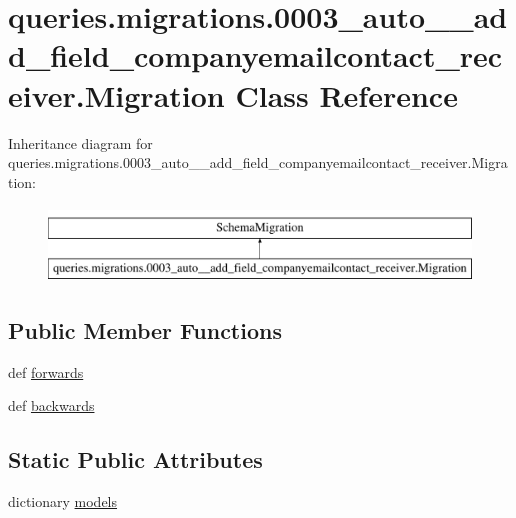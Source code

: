 \hypertarget{classqueries_1_1migrations_1_10003__auto____add__field__companyemailcontact__receiver_1_1_migration}{\section{queries.\-migrations.0003\-\_\-auto\-\_\-\-\_\-add\-\_\-field\-\_\-companyemailcontact\-\_\-receiver.Migration Class Reference}
\label{classqueries_1_1migrations_1_10003__auto____add__field__companyemailcontact__receiver_1_1_migration}
}
Inheritance diagram for queries.\-migrations.0003\-\_\-auto\-\_\-\-\_\-add\-\_\-field\-\_\-companyemailcontact\-\_\-receiver.Migration\-:\begin{figure}[H]
\begin{center}
\leavevmode
\includegraphics[height=2.000000cm]{classqueries_1_1migrations_1_10003__auto____add__field__companyemailcontact__receiver_1_1_migration}
\end{center}
\end{figure}
\subsection*{Public Member Functions}
\begin{DoxyCompactItemize}
\item 
def \hyperlink{classqueries_1_1migrations_1_10003__auto____add__field__companyemailcontact__receiver_1_1_migration_aee394a86ebc99687fcdbccdf2fc6416d}{forwards}
\item 
def \hyperlink{classqueries_1_1migrations_1_10003__auto____add__field__companyemailcontact__receiver_1_1_migration_ab082668bdad0f9b5ffd519f13c086b5a}{backwards}
\end{DoxyCompactItemize}
\subsection*{Static Public Attributes}
\begin{DoxyCompactItemize}
\item 
dictionary \hyperlink{classqueries_1_1migrations_1_10003__auto____add__field__companyemailcontact__receiver_1_1_migration_a864569864ef255383c67b1300710bea0}{models}
\end{DoxyCompactItemize}


